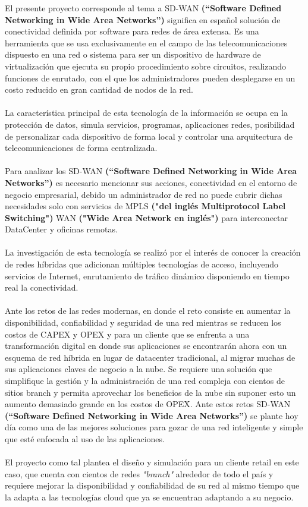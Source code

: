 El presente proyecto corresponde al tema a SD-WAN \textbf{(“Software Defined Networking in Wide Area Networks”)} significa en español solución de conectividad definida por software para redes de área extensa. Es una herramienta que se usa exclusivamente en el campo de las telecomunicaciones dispuesto en una red o sistema para ser un dispositivo de hardware de virtualización que ejecuta su propio procedimiento sobre circuitos, realizando funciones de enrutado, con el que los administradores pueden desplegarse en un costo reducido en gran cantidad de nodos de la red.
\\
\\
La característica principal de esta tecnología de la información se ocupa en la protección de datos, simula servicios, programas, aplicaciones redes, posibilidad de personalizar cada dispositivo de forma local y controlar una arquitectura de telecomunicaciones de forma centralizada.
\\
\\
Para analizar los SD-WAN \textbf{(“Software Defined Networking in Wide Area Networks”)} es necesario mencionar sus acciones, conectividad en el entorno de negocio empresarial,  debido un administrador de red no puede cubrir dichas necesidades solo con servicios de MPLS \textbf{("del inglés Multiprotocol Label Switching")} WAN \textbf{("Wide Area Network en inglés")} para interconectar DataCenter y oficinas remotas.
\\
\\
La investigación de esta tecnología se realizó por el interés de conocer la creación de redes híbridas que adicionan múltiples tecnologías de acceso, incluyendo servicios de Internet, enrutamiento de tráfico dinámico disponiendo en tiempo real la conectividad.
\\
\\
Ante los retos de las redes modernas, en donde el reto consiste en aumentar la disponibilidad, confiabilidad y seguridad de una red mientras se reducen los costos de CAPEX y OPEX y para un cliente que se enfrenta a una transformación digital en donde sus aplicaciones se encontrarán ahora con un esquema de red híbrida en lugar de datacenter tradicional, al migrar muchas de sus aplicaciones claves de negocio a la nube. Se requiere una solución que simplifique la gestión y la administración de una red compleja con cientos de sitios branch y permita aprovechar los beneficios de la nube sin suponer esto un aumento demasiado grande en los costos de OPEX. Ante estos retos SD-WAN \textbf{(“Software Defined Networking in Wide Area Networks”)} se plante hoy día como una de las mejores soluciones para gozar de una red inteligente y simple que esté enfocada al uso de las aplicaciones.
\\
\\
El proyecto como tal plantea el diseño y simulación para un cliente retail en este caso, que cuenta con cientos de redes \textit{"branch"} alrededor de todo el país y requiere mejorar la disponibilidad y confiabilidad de su red al mismo tiempo que la adapta a las tecnologías cloud que ya se encuentran adaptando a su negocio.

